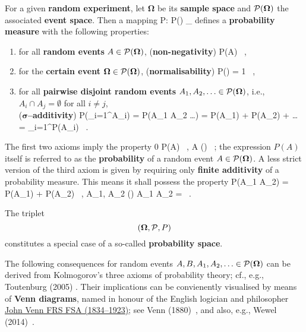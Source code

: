 \medskip
\noindent
For a given \textbf{random experiment}, let $\boldsymbol{\Omega}$
be its \textbf{sample space} and ${\cal P}(\boldsymbol{\Omega})$
the associated \textbf{event space}. Then a mapping
%
\be
P: {\cal P}(\boldsymbol{\Omega}) \rightarrow {}_{}
\ee
%
defines a \textbf{probability measure} with the following
properties:
%
\begin{enumerate}
\item for all \textbf{random events} $A \in {\cal 
P}(\boldsymbol{\Omega})$, 
\hfill (\textbf{non-negativity})
%
\be
P(A)  \ ,
\ee
%

\item for the \textbf{certain event} $\boldsymbol{\Omega} \in 
{\cal P}(\boldsymbol{\Omega})$, \hfill (\textbf{normalisability})
%
\be
P(\boldsymbol{\Omega}) = 1 \ ,
\ee
%

\item for all \textbf{pairwise disjoint random events} $A_{1},
A_{2}, \ldots \in {\cal P}(\boldsymbol{\Omega})$, i.e., $A_{i}
\cap A_{j} = \emptyset$ for all $i \neq j$,\\
\mbox{} \hfill ($\boldsymbol{\sigma}$\textbf{--additivity})
%
\be
P\left(\bigcup_{i=1}^{\infty}A_{i}\right)
= P(A_{1} \cup A_{2} \cup \ldots)
= P(A_{1}) + P(A_{2}) + \ldots
= \sum_{i=1}^{\infty}P(A_{i}) \ .
\ee
%

\end{enumerate}
%
The first two axioms imply the property
%
\be
{}
0 \leq P(A)  \ ,
\quad{}\quad
A (\boldsymbol{\Omega}) \ ;
\ee
%
the expression $P(A)$ itself is referred to as the
\textbf{probability} of a random event $A \in {\cal 
P}(\boldsymbol{\Omega})$. A less strict version of the third axiom
is given by requiring only \textbf{finite additivity} of a
probability measure. This means it shall possess the property
%
\be
P(A_{1} \cup A_{2}) = P(A_{1}) + P(A_{2}) \ ,
\quad{}\quad
A_{1}, A_{2} (\boldsymbol{\Omega})
\quad{}\quad A_{1} \cap A_{2} = \emptyset \ .
\ee
%

\medskip
\noindent
The triplet
%
\[
\left(\boldsymbol{\Omega}, {\cal P}, P\right)
\]
%
constitutes a special case of a so-called \textbf{probability
space}.

\medskip
\noindent
The following consequences for random events $A, B, A_{1}, A_{2}, 
\ldots \in {\cal P}(\boldsymbol{\Omega})$ can be derived from 
Kolmogorov's three axioms of probability theory; cf., e.g., 
Toutenburg (2005) . Their implications can be 
convienently visualised by means of \textbf{Venn diagrams}, 
named in honour of the English logician and philosopher 
\href{http://www-history.mcs.st-and.ac.uk/Biographies/Venn.html}{John
Venn FRS FSA (1834--1923)}; see Venn (1880)~, and also,
e.g., Wewel (2014)~.

